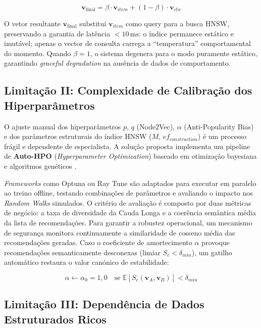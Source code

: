 \documentclass[11pt,a4paper]{article}
\begin{document}
\begin{equation}
\mathbf{v}_{\text{final}} = \beta \cdot \mathbf{v}_{item} + (1 - \beta) \cdot \mathbf{v}_{ctx}
\end{equation}

O vetor resultante $\mathbf{v}_{\text{final}}$ substitui $\mathbf{v}_{item}$ como query para a
busca HNSW, preservando a garantia de latência $<10\,\text{ms}$: o índice permanece estático e
imutável; apenas o vector de consulta carrega a ``temperatura'' comportamental do momento.
Quando $\beta = 1$, o sistema degenera para o modo puramente estático, garantindo
\textit{graceful degradation} na ausência de dados de comportamento.

\subsection{Limitação II: Complexidade de Calibração dos Hiperparâmetros}

O ajuste manual dos hiperparâmetros $p$, $q$ (Node2Vec), $\alpha$ (Anti-Popularity Bias) e dos
parâmetros estruturais do índice HNSW ($M$, $ef_{construction}$) é um processo frágil e
dependente de especialista. A solução proposta implementa um pipeline de
\textbf{Auto-HPO} (\textit{Hyperparameter Optimization}) baseado em otimização bayesiana e
algoritmos genéticos \cite{automl_graph}.

\textit{Frameworks} como Optuna ou Ray Tune são adaptados para executar em paralelo ao treino
offline, testando combinações de parâmetros e avaliando o impacto nos \textit{Random Walks}
simulados. O critério de avaliação é composto por duas métricas de negócio: a taxa de
diversidade da Cauda Longa e a coerência semântica média da lista de recomendações. Para
garantir a robustez operacional, um mecanismo de segurança monitora continuamente a similaridade
de cosseno média das recomendações geradas. Caso o coeficiente de amortecimento $\alpha$ provoque
recomendações semanticamente desconexas (limiar $S_c < \delta_{min}$), um gatilho automático
restaura o valor canónico de estabilidade:

\begin{equation}
\alpha \leftarrow \alpha_0 = 1{,}0 \quad \text{se } \mathbb{E}[S_c(\mathbf{v}_A, \mathbf{v}_B)] < \delta_{min}
\end{equation}

\subsection{Limitação III: Dependência de Dados Estruturados Ricos}
\end{document}
